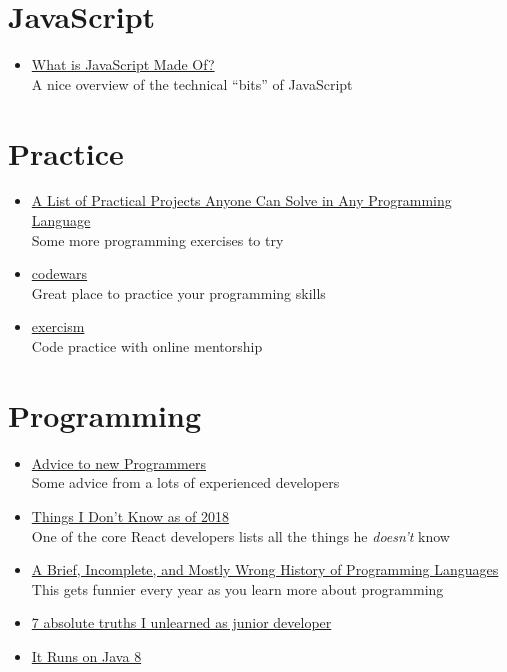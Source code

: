 \section*{JavaScript}

\begin{itemize}[leftmargin=*]
    \item
        \href{https://overreacted.io/what-is-javascript-made-of/}{What is JavaScript Made Of?}\\
        A nice overview of the technical ``bits'' of JavaScript
\end{itemize}


\section*{Practice}

\begin{itemize}[leftmargin=*]
    \item
        \href{https://github.com/karan/Projects}{A List of Practical Projects Anyone Can Solve in Any Programming Language}\\
        Some more programming exercises to try
    \item
        \href{https://www.codewars.com}{codewars}\\
        Great place to practice your programming skills
    \item
        \href{https://exercism.io}{exercism}\\
        Code practice with online mentorship
\end{itemize}

\section*{Programming}

\begin{itemize}[leftmargin=*]
    \item
        \href{http://olafurw.com/2019-01-27-programmer-advice/}{Advice to new Programmers}\\
        Some advice from a lots of experienced developers
    \item
        \href{https://overreacted.io/things-i-dont-know-as-of-2018/}{Things I Don't Know as of 2018}\\
        One of the core React developers lists all the things he \textit{doesn't} know
    \item
        \href{http://james-iry.blogspot.com/2009/05/brief-incomplete-and-mostly-wrong.html}{A Brief, Incomplete, and Mostly Wrong History of Programming Languages}\\
        This gets funnier every year as you learn more about programming
    \item
        \href{https://monicalent.com/blog/2019/06/03/absolute-truths-unlearned-as-junior-developer/}{7 absolute truths I unlearned as junior developer}
    \item
        \href{https://veekaybee.github.io/2019/05/10/java8/}{It Runs on Java 8}
\end{itemize}

